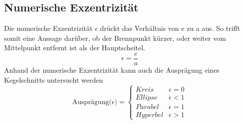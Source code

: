 \subsection{Numerische Exzentrizität}
Die numerische Exzentrizität $\epsilon$ drückt das Verhältnis von e zu a aus. So trifft somit eine Aussage darüber, ob der Brennpunkt kürzer, oder weiter vom Mittelpunkt entfernt ist als der Hauptscheitel.
\begin{displaymath}
	\epsilon = \frac{e}{a}
\end{displaymath}
Anhand der numerische Exzentrizität kann auch die Ausprägung eines Kegelschnitts untersucht werden 
\begin{displaymath}
   \text{Ausprägung($\epsilon$)} = \left\{
     \begin{array}{lr}
       Kreis & \epsilon = 0 \\
       Ellipse & \epsilon < 1\\
       Parabel & \epsilon = 1\\
       Hyperbel & \epsilon > 1
     \end{array}
   \right.
\end{displaymath}
